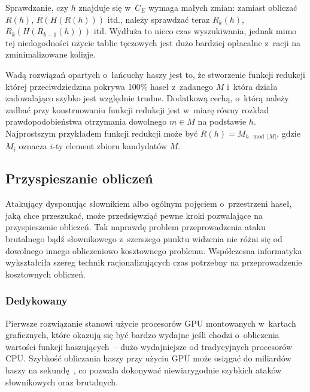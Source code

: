 Sprawdzanie, czy $h$ znajduje się w~$C_E$ wymaga małych zmian: zamiast obliczać
$R(h)$, $R(H(R(h)))$ itd., należy sprawdzać teraz $R_k(h)$, $R_k(H(R_{k-1}(h)))$
itd. Wydłuża to nieco czas wyszukiwania, jednak mimo tej niedogodności użycie
tablic tęczowych jest dużo bardziej opłacalne z~racji na zminimalizowane
kolizje.

Wadą rozwiązań opartych o~łańcuchy haszy jest to, że stworzenie funkcji
redukcji której przeciwdziedzina pokrywa 100\% haseł z~zadanego $M$ i~która
działa zadowalająco szybko jest względnie trudne. Dodatkową cechą, o~którą
należy zadbać przy konstruowaniu funkcji redukcji jest w~miarę równy rozkład
prawdopodobieństwa otrzymania dowolnego $m \in M$ na podstawie $h$.
Najprostszym przykładem funkcji redukcji może być $R(h) = M_{h \mod |M|}$,
gdzie $M_i$ oznacza $i$-ty element zbioru kandydatów $M$.



\subsection{Przyspieszanie obliczeń}
Atakujący dysponując słownikiem albo ogólnym pojęciem o~przestrzeni haseł, jaką
chce przeszukać, może przedsięwziąć pewne kroki pozwalające na przyspieszenie
obliczeń. Tak naprawdę problem przeprowadzenia ataku brutalnego bądź
słownikowego z~szerszego punktu widzenia nie różni się od dowolnego innego
obliczeniowo kosztownego problemu. Współczesna informatyka wykształciła szereg
technik racjonalizujących czas potrzebny na przeprowadzenie kosztownych
obliczeń.



\subsubsection{Dedykowany }

Pierwsze rozwiązanie stanowi użycie procesorów GPU montowanych w~kartach
graficznych, które okazują się być bardzo wydajne jeśli chodzi o~obliczenia
wartości funkcji haszujących~-- dużo wydajniejsze od tradycyjnych procesorów
CPU. Szybkość obliczania haszy przy użyciu GPU może osiągać do miliardów
haszy na sekundę~\cite{gpu_cracking_benchmarks}, co pozwala dokonywać
niewiarygodnie szybkich ataków słownikowych oraz brutalnych.

